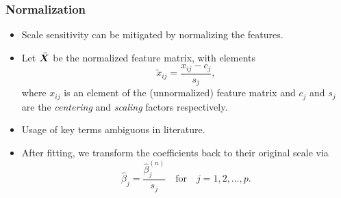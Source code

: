 \documentclass[10pt]{beamer}
\begin{document}
\begin{frame}[c]
  \frametitle{Normalization}

  \begin{itemize}[<+->]
    \item Scale sensitivity can be mitigated by normalizing the features.
    \item Let \(\tilde{\bm{X}}\) be the normalized feature matrix, with elements
          \[
            \tilde{x}_{ij} = \frac{x_{ij} - c_{j}}{s_j},
          \]
          where \(x_{ij}\) is an element of the (unnormalized) feature matrix and \(c_j\) and \(s_j\)
          are the \emph{centering} and \emph{scaling} factors respectively.
    \item Usage of key terms ambiguous in literature.
    \item After fitting, we transform the coefficients back to their original scale via
          \[
            \hat\beta_j = \frac{\hat\beta^{(n)}_j}{s_j} \quad\text{for}\quad j = 1,2,\dots,p.
          \]

  \end{itemize}

\end{frame}
\end{document}

